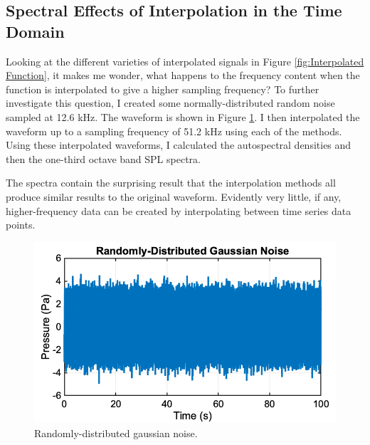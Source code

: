 \subsection{Spectral Effects of Interpolation in the Time Domain}

Looking at the different varieties of interpolated signals in Figure \ref{fig:Interpolated Function}, it makes me wonder, what happens to the frequency content when the function is interpolated to give a higher sampling frequency? To further investigate this question, I created some normally-distributed random noise sampled at 12.6 kHz. The waveform is shown in Figure \ref{fig:Randomly-Distributed Gaussian Noise}. I then interpolated the waveform up to a sampling frequency of 51.2 kHz using each of the methods. Using these interpolated waveforms, I calculated the autospectral densities and then the one-third octave band SPL spectra.

The spectra contain the surprising result that the interpolation methods all produce similar results to the original waveform. Evidently very little, if any, higher-frequency data can be created by interpolating between time series data points.

\begin{figure}[htp]
    \centering
    \includegraphics[width = 5 in]{Chapters/Computational Methods/Figures/Randomly-Distributed Gaussian Noise.png}
    \caption{Randomly-distributed gaussian noise.}
    \label{fig:Randomly-Distributed Gaussian Noise}
\end{figure}

